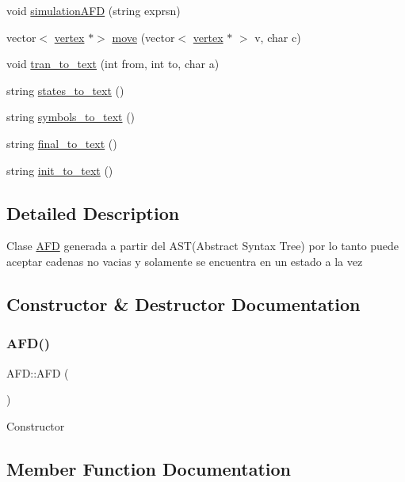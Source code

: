 \begin{DoxyCompactItemize}
\item 
void \hyperlink{class_a_f_d_a536493b9063f9e9c4eb734d3560f7a7d}{simulation\+A\+FD} (string exprsn)
\item 
vector$<$ \hyperlink{structvertex}{vertex} $\ast$$>$ \hyperlink{class_a_f_d_a4505bb76534ae8c4df01c164912f5c52}{move} (vector$<$ \hyperlink{structvertex}{vertex} $\ast$ $>$ v, char c)
\item 
void \hyperlink{class_a_f_d_a5c2a7a1aeb7fc4acba6ad6dd12603112}{tran\+\_\+to\+\_\+text} (int from, int to, char a)
\item 
string \hyperlink{class_a_f_d_a8c3da4d57cbc9bae76e775cb6b216d64}{states\+\_\+to\+\_\+text} ()
\item 
string \hyperlink{class_a_f_d_afee8c78c7a823e360e8e69136806e7c5}{symbols\+\_\+to\+\_\+text} ()
\item 
string \hyperlink{class_a_f_d_a6882d0942eceb2af40e8a1fe7c057d6e}{final\+\_\+to\+\_\+text} ()
\item 
string \hyperlink{class_a_f_d_ae2bf9a8a6511e585c911ff1c2416bb3e}{init\+\_\+to\+\_\+text} ()
\end{DoxyCompactItemize}


\subsection{Detailed Description}
Clase \hyperlink{class_a_f_d}{A\+FD} generada a partir del A\+S\+T(\+Abstract Syntax Tree) por lo tanto puede aceptar cadenas no vacias y solamente se encuentra en un estado a la vez 

\subsection{Constructor \& Destructor Documentation}
\hypertarget{class_a_f_d_a69ad82d0fe1418e4c141649763a585a6}{}\label{class_a_f_d_a69ad82d0fe1418e4c141649763a585a6} 
\subsubsection{\texorpdfstring{A\+F\+D()}{AFD()}}
{\footnotesize\ttfamily A\+F\+D\+::\+A\+FD (\begin{DoxyParamCaption}{ }\end{DoxyParamCaption})}

Constructor 

\subsection{Member Function Documentation}
\hypertarget{class_a_f_d_a9b17ebe33cebd28351196a217b023a0e}{}\label{class_a_f_d_a9b17ebe33cebd28351196a217b023a0e} 
